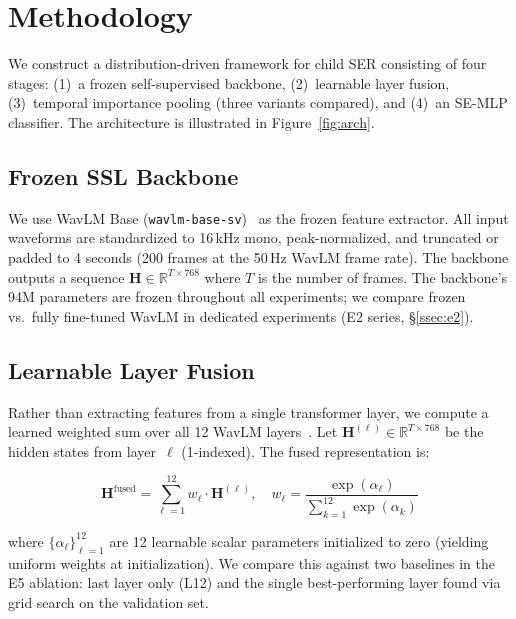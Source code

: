 \documentclass[11pt,a4paper]{article}
\begin{document}

\section{Methodology}
\label{sec:methodology}

We construct a distribution-driven framework for child SER consisting of four
stages: (1)~a frozen self-supervised backbone, (2)~learnable layer fusion,
(3)~temporal importance pooling (three variants compared), and (4)~an SE-MLP
classifier. The architecture is illustrated in Figure~\ref{fig:arch}.

\subsection{Frozen SSL Backbone}
\label{ssec:backbone}

We use WavLM Base (\texttt{wavlm-base-sv})~\cite{chen2022wavlm} as the frozen
feature extractor. All input waveforms are standardized to 16\,kHz mono,
peak-normalized, and truncated or padded to 4 seconds (200 frames at the 50\,Hz
WavLM frame rate). The backbone outputs a sequence $\mathbf{H} \in
\mathbb{R}^{T \times 768}$ where $T$ is the number of frames. The backbone's
94M parameters are frozen throughout all experiments; we compare frozen
vs.\ fully fine-tuned WavLM in dedicated experiments (E2 series,
\S\ref{ssec:e2}).

\subsection{Learnable Layer Fusion}
\label{ssec:layer_fusion}

Rather than extracting features from a single transformer layer, we compute a
learned weighted sum over all 12 WavLM layers~\cite{rozen2024layer}. Let
$\mathbf{H}^{(\ell)} \in \mathbb{R}^{T \times 768}$ be the hidden states from
layer~$\ell$ (1-indexed). The fused representation is:

\begin{equation}
\mathbf{H}^{\text{fused}} = \sum_{\ell=1}^{12} w_\ell \cdot \mathbf{H}^{(\ell)},
\quad w_\ell = \frac{\exp(\alpha_\ell)}{\sum_{k=1}^{12} \exp(\alpha_k)}
\end{equation}

where $\{\alpha_\ell\}_{\ell=1}^{12}$ are 12 learnable scalar parameters
initialized to zero (yielding uniform weights at initialization). We compare
this against two baselines in the E5 ablation: last layer only (L12) and the
single best-performing layer found via grid search on the validation set.
\end{document}
